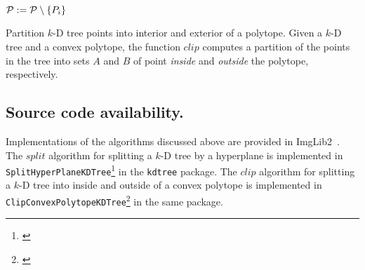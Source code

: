 \begin{algorithm}[H]
{{{        $\mathcal{P} := \mathcal{P} \setminus \left\{P_i\right\}$\;
      }
    }
        \BlankLine
        \BlankLine
  }
  \caption{Partition $k$-D tree points into interior and exterior of a polytope.
    Given a $k$-D tree and a convex polytope, the function $\mathit{clip}$ computes a partition of the points in the tree
      into sets $A$ and $B$ of point \emph{inside} and \emph{outside} the polytope, respectively.}
  \label{alg:clip}
\end{algorithm}



\subsection{Source code availability.}
Implementations of the algorithms discussed above are provided in ImgLib2~\cite{ImgLib2paper}.
The $\mathit{split}$ algorithm for splitting a $k$-D tree by a hyperplane is implemented in \texttt{SplitHyperPlaneKDTree}\footnote{\href{https://github.com/imglib/imglib2-algorithm/blob/master/src/main/java/net/imglib2/algorithm/kdtree/SplitHyperPlaneKDTree.java}{}} in the \texttt{kdtree} package.
The $\mathit{clip}$ algorithm for splitting a $k$-D tree into inside and outside of a convex polytope is implemented in \texttt{ClipConvexPolytopeKDTree}\footnote{
\href{https://github.com/imglib/imglib2-algorithm/blob/master/src/main/java/net/imglib2/algorithm/kdtree/ClipConvexPolytopeKDTree.java}{}} in the same package.

